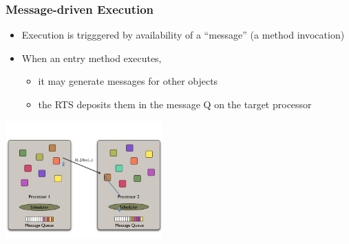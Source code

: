 \begin{frame}[t]
\frametitle{Message-driven Execution}
  \begin{itemize}
    \item Execution is trigggered by availability of a ``message'' (a method invocation)
    \pause
    \item When an entry method executes, 
    \begin{itemize}
      \item it may generate messages for other objects
      \item the RTS deposits them in the message Q on the target processor
    \end{itemize}
  \end{itemize}
  \begin{center} \includegraphics[width=0.45\textwidth]{figures/schedulerInvocation} \end{center}
\end{frame}

